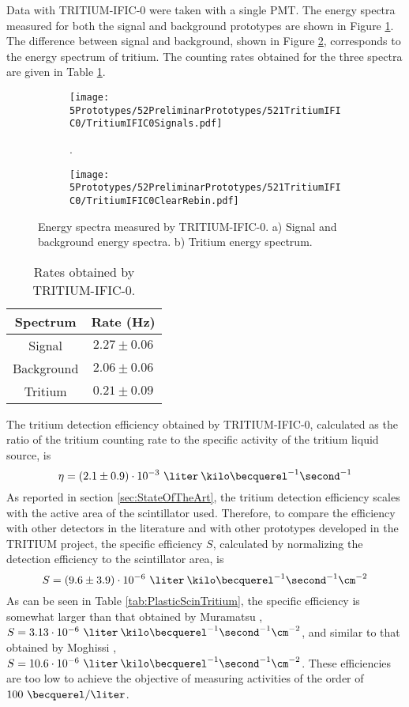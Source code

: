 Data with TRITIUM-IFIC-0 were taken with a single PMT. The energy spectra measured for both the signal and background prototypes are shown in Figure \ref{subfig:SignalBackgroundEnergySpectraTritiumIFIC0}. The difference between signal and background, shown in Figure \ref{subfig:TritiumEnergySpectraTritiumIFIC0}, corresponds to the energy spectrum of tritium. The counting rates obtained for the three spectra are given in Table \ref{tab:CountsPerSecondTRITIUMIFIC0}.
\begin{figure}
\centering
    \begin{subfigure}[b]{1\textwidth}
    \centering
    \texttt{[image: 5Prototypes/52PreliminarPrototypes/521TritiumIFIC0/TritiumIFIC0Signals.pdf]}  
    \caption{.\label{subfig:SignalBackgroundEnergySpectraTritiumIFIC0}}
    \end{subfigure}
    \hfill
    \begin{subfigure}[b]{1\textwidth}
    \centering
    \texttt{[image: 5Prototypes/52PreliminarPrototypes/521TritiumIFIC0/TritiumIFIC0ClearRebin.pdf]}  
    \caption{\label{subfig:TritiumEnergySpectraTritiumIFIC0}}
    \end{subfigure}
 \caption{Energy spectra measured by TRITIUM-IFIC-0. a) Signal and background energy spectra. b) Tritium energy spectrum.}
 \label{fig:EnergySpectraTRITIUMIFIC0}
\end{figure}
\begin{table}[htbp]
\centering{}%
\begin{tabular}{cc}
\toprule 
Spectrum & Rate (Hz) \tabularnewline
\midrule
\midrule 
Signal & $2.27 \pm 0.06$ \tabularnewline
Background & $2.06 \pm 0.06$ \tabularnewline  
Tritium & $0.21 \pm 0.09$ \tabularnewline
\bottomrule
\end{tabular}
\caption{Rates obtained by TRITIUM-IFIC-0.}
\label{tab:CountsPerSecondTRITIUMIFIC0}
\end{table}
The tritium detection efficiency obtained by TRITIUM-IFIC-0, calculated as the ratio of the tritium counting rate to the specific activity of the tritium liquid source, is $$\eta=(2.1 \pm 0.9)\cdot{} 10^{-3}~\liter\:\kilo\becquerel^{-1}\second^{-1}$$
As reported in section \ref{sec:StateOfTheArt}, the tritium detection efficiency scales with the active area of the scintillator used. Therefore, to compare the efficiency with other detectors in the literature and with other prototypes developed in the TRITIUM project, the specific efficiency $S$, calculated by normalizing the detection efficiency to the scintillator area, is
$$S = (9.6 \pm 3.9)\cdot{} 10^{-6}~\liter\:\kilo\becquerel^{-1}\second^{-1}\cm^{-2}$$
As can be seen in Table \ref{tab:PlasticScinTritium}, the specific efficiency is somewhat larger than that obtained by Muramatsu \cite{Muramatsu}, $S=3.13 \cdot{} 10^{-6}~\liter\:\kilo\becquerel^{-1}\second^{-1}\cm^{-2}$, and similar to that obtained by Moghissi \cite{Moghissi}, $S=10.6 \cdot{} 10^{-6}~\liter\:\kilo\becquerel^{-1}\second^{-1}\cm^{-2}$. These efficiencies are too low to achieve the objective of measuring activities of the order of $100~\becquerel/\liter$. 

